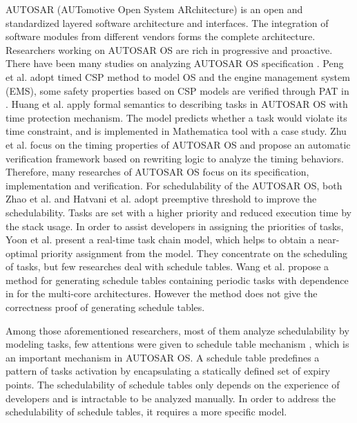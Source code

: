 \documentclass[10pt,conference]{IEEEtran}
\begin{document}
AUTOSAR (AUTomotive Open System ARchitecture) \cite{autosar} is an open and standardized layered software architecture and interfaces. The integration of software modules from different vendors forms the complete architecture. %
Researchers working on AUTOSAR OS are rich in progressive and proactive. There have been many studies on analyzing AUTOSAR OS specification \cite{DBLP:conf/isorc/AnssiTKGT11}. 
Peng et al. adopt timed CSP method to model OS and the engine management system (EMS), some safety properties based on CSP models are verified through PAT in \cite{DBLP:conf/tase/PengHSG13}. Huang et al. \cite{DBLP:conf/icfem/HuangFHQH13} apply formal semantics to describing tasks in AUTOSAR OS with time protection mechanism. The model predicts whether a task would violate its time constraint, and is implemented in Mathematica tool with a case study. Zhu et al. \cite{DBLP:conf/tase/ZhuLSWZ13} focus on the timing properties of AUTOSAR OS and propose an automatic verification framework based on rewriting logic to analyze the timing behaviors. Therefore, many researches of AUTOSAR OS focus on its specification, implementation and verification. 
For schedulability of the AUTOSAR OS, both Zhao et al. \cite{DBLP:journals/jsa/ZhaoGZ17} and Hatvani et al. \cite{DBLP:conf/etfa/HatvaniB15} adopt preemptive threshold to improve the schedulability. Tasks are set with a higher priority and reduced execution time by the stack usage. In order to assist developers in assigning the priorities of tasks, Yoon et al. \cite{DBLP:conf/racs/YoonR14} present a real-time task chain model, which helps to obtain a near-optimal priority assignment from the model. They concentrate on the scheduling of tasks, but few researches deal with schedule tables. Wang et al. propose a method for generating schedule tables containing periodic tasks with dependence in \cite{DBLP:conf/dasip/WangCM16} for the multi-core architectures. However the method does not give the correctness proof of generating schedule tables.

Among those aforementioned researchers, most of them analyze schedulability by modeling tasks, few attentions were given to schedule table mechanism \cite{autosar}, which is an important mechanism in AUTOSAR OS. A schedule table predefines a pattern of tasks activation by encapsulating a statically defined set of expiry points. The schedulability of schedule tables only depends on the experience of developers and is intractable to be analyzed manually. In order to address the schedulability of schedule tables, it requires a more specific model.
\end{document}
